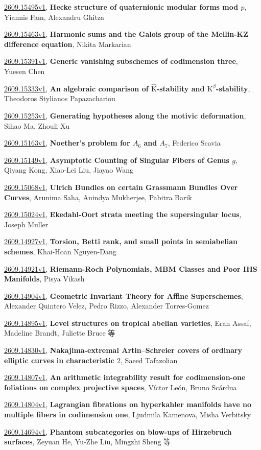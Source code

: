 \documentclass[9pt, a4paper]{article}
\theoremstyle{plain}
\theoremstyle{definition}
\theoremstyle{remark}
\newcommand{\arxiv}[3]{\href{https://arxiv.org/abs/#1}{#1}, \textbf{\textcolor{arxivblue}{#2}}, #3}
\begin{document}
\arxiv{2609.15495v1}{Hecke structure of quaternionic modular forms mod $p$}{Yiannis Fam, Alexandru Ghitza}

\arxiv{2609.15463v1}{Harmonic sums and the Galois group of the Mellin-KZ difference equation}{Nikita Markarian}

\arxiv{2609.15391v1}{Generic vanishing subschemes of codimension three}{Yuesen Chen}

\arxiv{2609.15333v1}{An algebraic comparison of $\widehat{\mathrm K}$-stability and $\mathrm K^β$-stability}{Theodoros Stylianos Papazachariou}

\arxiv{2609.15253v1}{Generating hypotheses along the motivic deformation}{Sihao Ma, Zhouli Xu}

\arxiv{2609.15163v1}{Noether's problem for $A_6$ and $A_7$}{Federico Scavia}

\arxiv{2609.15149v1}{Asymptotic Counting of Singular Fibers of Genus $g$}{Qiyang Kong, Xiao-Lei Liu, Jiayao Wang}

\arxiv{2609.15068v1}{Ulrich Bundles on certain Grassmann Bundles Over Curves}{Arunima Saha, Anindya Mukherjee, Pabitra Barik}

\arxiv{2609.15024v1}{Ekedahl-Oort strata meeting the supersingular locus}{Joseph Muller}

\arxiv{2609.14927v1}{Torsion, Betti rank, and small points in semiabelian schemes}{Khai-Hoan Nguyen-Dang}

\arxiv{2609.14921v1}{Riemann-Roch Polynomials, MBM Classes and Poor IHS Manifolds}{Pisya Vikash}

\arxiv{2609.14904v1}{Geometric Invariant Theory for Affine Superschemes}{Alexander Quintero Velez, Pedro Rizzo, Alexander Torres-Gomez}

\arxiv{2609.14895v1}{Level structures on tropical abelian varieties}{Eran Assaf, Madeline Brandt, Juliette Bruce 等}

\arxiv{2609.14830v1}{Nakajima-extremal Artin--Schreier covers of ordinary elliptic curves in characteristic $2$}{Saeed Tafazolian}

\arxiv{2609.14807v1}{An arithmetic integrability result for codimension-one foliations on complex projective spaces}{Víctor León, Bruno Scárdua}

\arxiv{2609.14804v1}{Lagrangian fibrations on hyperkahler manifolds have no multiple fibers in codimension one}{Ljudmila Kamenova, Misha Verbitsky}

\arxiv{2609.14694v1}{Phantom subcategories on blow-ups of Hirzebruch surfaces}{Zeyuan He, Yu-Zhe Liu, Mingzhi Sheng 等}
\end{document}
